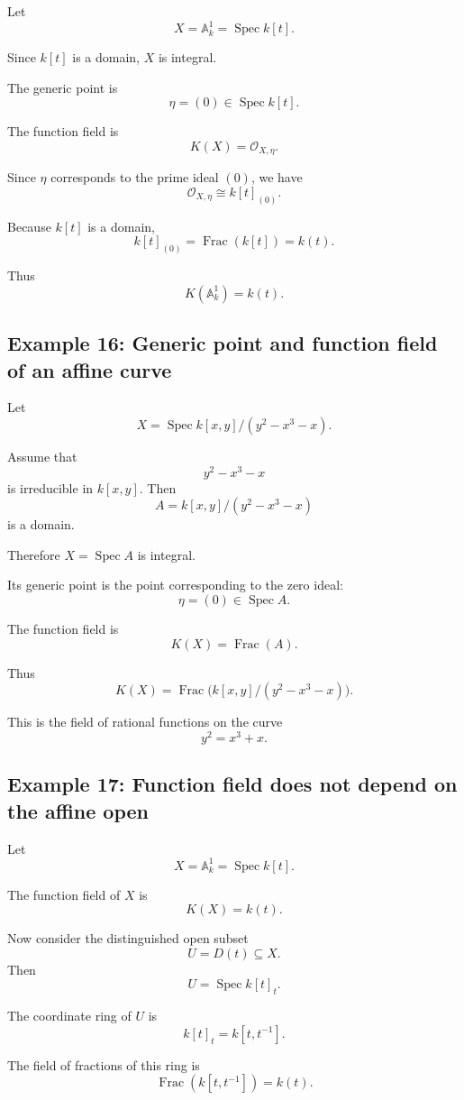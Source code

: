 \documentclass[12pt,a4paper]{article}
\theoremstyle{notespace}
\begin{document}
Let
\[
X=\mathbb A_k^1=\operatorname{Spec} k[t].
\]

Since \(k[t]\) is a domain, \(X\) is integral.

The generic point is
\[
\eta=(0)\in \operatorname{Spec} k[t].
\]

The function field is
\[
K(X)=\mathcal O_{X,\eta}.
\]

Since \(\eta\) corresponds to the prime ideal \((0)\), we have
\[
\mathcal O_{X,\eta}\cong k[t]_{(0)}.
\]

Because \(k[t]\) is a domain,
\[
k[t]_{(0)}=\operatorname{Frac}(k[t])=k(t).
\]

Thus
\[
K(\mathbb A_k^1)=k(t).
\]

\subsection{Example 16: Generic point and function field of an affine curve}

Let
\[
X=\operatorname{Spec} k[x,y]/(y^2-x^3-x).
\]

Assume that
\[
y^2-x^3-x
\]
is irreducible in \(k[x,y]\). Then
\[
A=k[x,y]/(y^2-x^3-x)
\]
is a domain.

Therefore \(X=\operatorname{Spec} A\) is integral.

Its generic point is the point corresponding to the zero ideal:
\[
\eta=(0)\in \operatorname{Spec} A.
\]

The function field is
\[
K(X)=\operatorname{Frac}(A).
\]

Thus
\[
K(X)=\operatorname{Frac}\bigl(k[x,y]/(y^2-x^3-x)\bigr).
\]

This is the field of rational functions on the curve
\[
y^2=x^3+x.
\]

\subsection{Example 17: Function field does not depend on the affine open}

Let
\[
X=\mathbb A_k^1=\operatorname{Spec} k[t].
\]

The function field of \(X\) is
\[
K(X)=k(t).
\]

Now consider the distinguished open subset
\[
U=D(t)\subseteq X.
\]
Then
\[
U=\operatorname{Spec} k[t]_t.
\]

The coordinate ring of \(U\) is
\[
k[t]_t=k[t,t^{-1}].
\]

The field of fractions of this ring is
\[
\operatorname{Frac}(k[t,t^{-1}])=k(t).
\]
\end{document}
